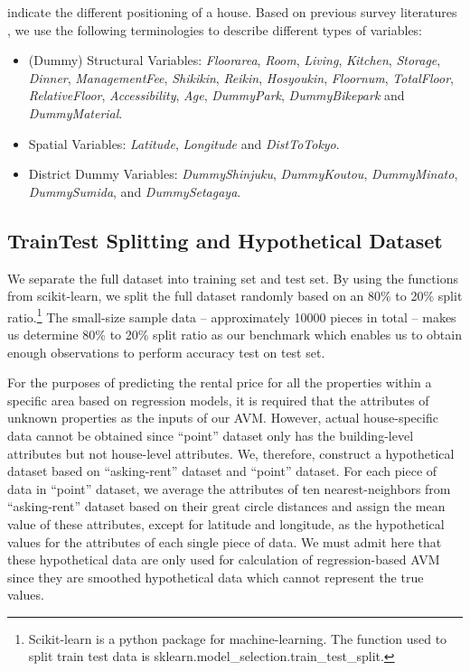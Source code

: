 \documentclass[a4paper, 12pt]{article} %
\newcommand{\var}[1][\textit]{#1}
\begin{document}
indicate the different positioning of a house. Based on previous survey literatures \citep{green2003primer, sirmans2005composition}, we use the following terminologies to describe different types of variables:

\begin{itemize}
\item (Dummy) Structural Variables: \var{Floorarea}, \var{Room}, \var{Living}, \var{Kitchen}, \var{Storage}, \var{Dinner}, \var{ManagementFee}, \var{Shikikin}, \var{Reikin}, \var{Hosyoukin}, \var{Floornum}, \var{TotalFloor}, \var{RelativeFloor}, \var{Accessibility}, \var{Age}, \var{DummyPark}, \var{DummyBikepark} and \var{DummyMaterial}. 
\item Spatial Variables: \var{Latitude}, \var{Longitude} and \var{DistToTokyo}. 
\item District Dummy Variables: \var{DummyShinjuku}, \var{DummyKoutou}, \var{DummyMinato}, \var{DummySumida}, and \var{DummySetagaya}. 
\end{itemize}

\subsection{TrainTest Splitting and Hypothetical Dataset}
\label{sec33}
We separate the full dataset into training set and test set. By using the functions from scikit-learn, we split the full dataset randomly based on an 80\% to 20\% split ratio.\footnote{Scikit-learn is a python package for machine-learning. The function used to split train test data is sklearn.model\_selection.train\_test\_split.} The small-size sample data – approximately 10000 pieces in total – makes us determine 80\% to 20\% split ratio as our benchmark which enables us to obtain enough observations to perform accuracy test on test set.

For the purposes of predicting the rental price for all the properties within a specific area based on regression models, it is required that the attributes of unknown properties as the inputs of our AVM. However, actual house-specific data cannot be obtained since “point” dataset only has the building-level attributes but not house-level attributes. We, therefore, construct a hypothetical dataset based on “asking-rent” dataset and “point” dataset. For each piece of data in “point” dataset, we average the attributes of ten nearest-neighbors from “asking-rent” dataset based on their great circle distances and assign the mean value of these attributes, except for latitude and longitude, as the hypothetical values for the attributes of each single piece of data. We must admit here that these hypothetical data are only used for calculation of regression-based AVM since they are smoothed hypothetical data which cannot represent the true values.
\end{document}
